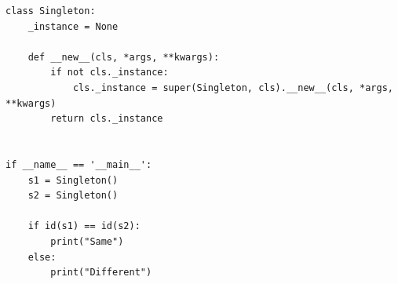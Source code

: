 
\begin{frame}[fragile]
%
\begin{codebox}
\begin{verbatim}
class Singleton:
    _instance = None
    
    def __new__(cls, *args, **kwargs):
        if not cls._instance:
            cls._instance = super(Singleton, cls).__new__(cls, *args, **kwargs)
        return cls._instance


if __name__ == '__main__':
    s1 = Singleton()
    s2 = Singleton()
    
    if id(s1) == id(s2):
        print("Same")
    else:
        print("Different")
\end{verbatim}
\end{codebox}
%
\end{frame}


